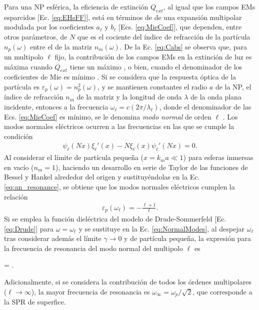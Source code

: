 Para una NP esférica, la eficiencia de extinción $Q_{ext}$, al igual que los campos EMs esparcidos [Ec. \eqref{eq:EHsFF}],  está en términos de de una expansión multipolar modulada por los coeficientes $a_\ell$ y $b_\ell$ [Ecs.  \eqref{eq:MieCoef}], que dependen, entre otros parámetros, de $N$ que es el cociente del índice de refracción de la partícula $n_p(\omega)$ entre el de la matriz $n_m(\omega)$.  De la Ec.  \eqref{eq:Cabs} se observa que, para un multipolo $\ell$ fijo, la contribución de los campos EMs en la extinción de luz es máxima  cuando $Q_{ext}$ tiene un máximo \cite{maier2007plasmonics}, o bien, cuando el denominador de los coeficientes de Mie es mínimo \cite{novotny2006principles}.  Si se considera que la respuesta óptica de la partícula es 	$\varepsilon_p (\omega) = n_p^2 (\omega)$, y se mantienen constantes el radio $a$ de la NP, el índice de refracción $n_m$ de la matriz y la longitud de onda $\lambda$ de la onda plana incidente, entonces a la frecuencia $\omega_\ell = c (2\pi / \lambda_\ell)$, donde el denominador de las Ecs.  \eqref{eq:MieCoef} es mínimo, se le denomina \emph{modo normal} de orden $\ell$ \cite{bohren1998absorption,maciel2017momentum}.  Los modos normales eléctricos ocurren a las frecuencias en las que se cumple la condición 
	\begin{align}
	\psi_\ell(Nx)\xi_\ell'(x)-N\xi_\ell(x)\psi_\ell'(Nx) = 0. 
	\label{eq:an_resonance}
	\end{align}
Al considerar el límite de partícula pequeña ($x = k_m a\ll 1$) para esferas inmersas en vacío ($n_m=1$), haciendo un desarrollo en serie de Taylor de las funciones de Bessel y Hankel alrededor del origen y sustituyéndolas en la Ec.  \eqref{eq:an_resonance}, se obtiene que los modos normales eléctricos cumplen la relación \cite{maciel2017momentum}
	\begin{align}
	\varepsilon_p(\omega_\ell) = - \frac{\ell+1}{\ell}.  
	\label{eq:NormalModes}
	\end{align}
Si se emplea la función dieléctrica del modelo de Drude-Sommerfeld [Ec.  \eqref{eq:Drude}] para $\omega = \omega_\ell$	y se sustituye en la Ec.  \eqref{eq:NormalModes}, al despejar $\omega_\ell$ tras considerar además el límite $\gamma\to 0$ y de partícula pequeña, la expresión para la frecuencia de resonancia del  modo normal del multipolo $\ell$ es \cite{maciel2017momentum}\vspace*{-.75em}
\begin{tcolorbox}[title =Frecuencia de resonancia del LSP, ams align,  breakable ]
	 = . \label{eq:PPequeña}
	\end{tcolorbox}\vspace*{-.75em}\noindent
Adicionalmente, si se considera la contribución de todos los órdenes multipolares ($\ell\to \infty$), la mayor frecuencia de resonancia es $\omega_\infty = \omega_p/\sqrt{2}$, que corresponde a la SPR de superfice.

